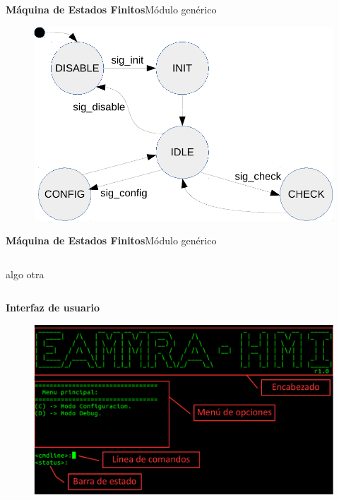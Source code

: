 \documentclass[11pt]{beamer}
\begin{document}
\begin{frame}{\textbf{\LARGE{Máquina de Estados Finitos}}}{Módulo genérico}
	\vspace{-1.1cm}
	\begin{figure}[H]
		\includegraphics[height=.8\textheight]{./imagenes/MEF_generica.pdf}
	\end{figure}	
\end{frame}

\begin{frame}{\textbf{\LARGE{Máquina de Estados Finitos}}}{Módulo genérico}
	\vspace{-.7cm}
	\begin{columns}
	  algo
	  otra
	\end{columns}
\end{frame}




\begin{frame}{\textbf{\LARGE{Interfaz de usuario}}}{}
	\vspace{-.7cm}
	\centering
	\begin{figure}[H]
		\includegraphics[width=\textwidth]{./imagenes/interfaz_detalles.pdf}
	\end{figure}	
\end{frame}
\end{document}
